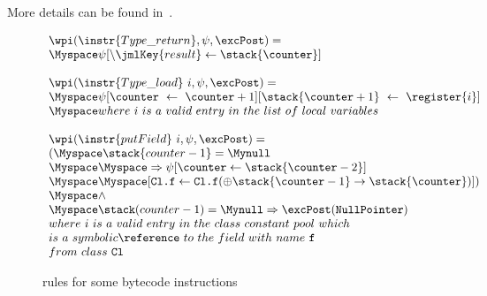  More details can be found in~\cite{WPBC}.
\begin{figure}[ht]

$$
\begin{array}{l}
\wpi(\instr{Type\_return} , \psi, \excPost) =  \\
 \Myspace \psi[\backslash \jmlKey{result} \leftarrow \stack{\counter}] \\
\\
\wpi(\instr{Type\_load} \ i, \psi, \excPost) =  \\
\Myspace \psi[\counter \ \leftarrow \ \counter+1] [\stack{\counter+1} \ \leftarrow \ \register{i}] \\
 \Myspace where \ i \  is \ a \ valid \ entry \ in \ the \ list \  of \  local \ variables   \\
\\ 
\wpi(\instr{putField} \ i, \psi, \excPost) = \\
   ( \Myspace \stack{counter -1} = \Mynull \\
   \Myspace  \Myspace \Rightarrow \psi[\counter \leftarrow \stack{\counter -2} ] \\
   \Myspace  \Myspace [\texttt{Cl.f} \leftarrow \texttt{Cl.f}(\oplus \stack{\counter - 1} \rightarrow \stack{\counter}) ] )\\
   \Myspace  \wedge  \\
   \Myspace  \stack(counter-1) = \Mynull \Rightarrow \excPost(\texttt{NullPointer}) \\
 where \ i \  is \ a \ valid \ entry \ in \ the \ class \ constant \  pool \ which   \\
 is  \ a \  symbolic \reference \ to \ the \  field  \ with \ name \  \texttt{f} \\
 from \  class \  \texttt{Cl}
 \end{array} $$



\caption{rules for some bytecode instructions}
\label{instrWP}
\end{figure}

